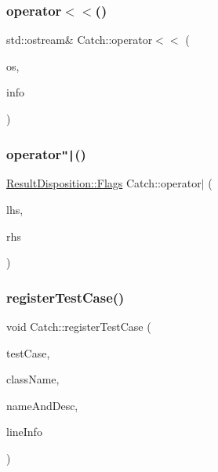 \mbox{\label{namespace_catch_a6ec18b5054d7fdfdde861c580b082995}} 
\subsubsection{\texorpdfstring{operator$<$$<$()}{operator<<()}}
{\footnotesize\ttfamily std\+::ostream\& Catch\+::operator$<$$<$ (\begin{DoxyParamCaption}\item[{std\+::ostream \&}]{os,  }\item[{\mbox{\hyperlink{struct_catch_1_1_source_line_info}{Source\+Line\+Info}} const \&}]{info }\end{DoxyParamCaption})}

\mbox{\label{namespace_catch_ab32a083e442cc09f736327d2e2865999}} 
\subsubsection{\texorpdfstring{operator\texttt{"|}()}{operator|()}}
{\footnotesize\ttfamily \mbox{\hyperlink{struct_catch_1_1_result_disposition_a3396cad6e2259af326b3aae93e23e9d8}{Result\+Disposition\+::\+Flags}} Catch\+::operator$\vert$ (\begin{DoxyParamCaption}\item[{\mbox{\hyperlink{struct_catch_1_1_result_disposition_a3396cad6e2259af326b3aae93e23e9d8}{Result\+Disposition\+::\+Flags}}}]{lhs,  }\item[{\mbox{\hyperlink{struct_catch_1_1_result_disposition_a3396cad6e2259af326b3aae93e23e9d8}{Result\+Disposition\+::\+Flags}}}]{rhs }\end{DoxyParamCaption})\hspace{0.3cm}{\ttfamily [inline]}}

\mbox{\label{namespace_catch_a9a59d681cc327a33c280796561dfe258}} 
\subsubsection{\texorpdfstring{register\+Test\+Case()}{registerTestCase()}}
{\footnotesize\ttfamily void Catch\+::register\+Test\+Case (\begin{DoxyParamCaption}\item[{\mbox{\hyperlink{struct_catch_1_1_i_test_case}{I\+Test\+Case}} $\ast$}]{test\+Case,  }\item[{char const $\ast$}]{class\+Name,  }\item[{\mbox{\hyperlink{struct_catch_1_1_name_and_desc}{Name\+And\+Desc}} const \&}]{name\+And\+Desc,  }\item[{\mbox{\hyperlink{struct_catch_1_1_source_line_info}{Source\+Line\+Info}} const \&}]{line\+Info }\end{DoxyParamCaption})}

